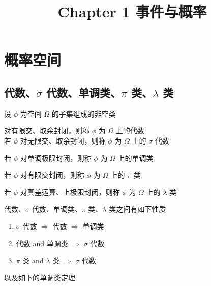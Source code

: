 \documentclass[12pt,a4paper]{amsart}
\title{Chapter 1 事件与概率}
\begin{document}
\maketitle\cite{杨振明2007}

\section{概率空间}

\subsection{代数、$\sigma$ 代数、单调类、$\pi$ 类、$\lambda$ 类}

设 $\phi$ 为空间 $\Omega$ 的子集组成的非空类

\begin{definition}
    对有限交、取余封闭，则称 $\phi$ 为 $\Omega$ 上的代数 \\
    若 $\phi$ 对无限交、取余封闭，则称 $\phi$ 为 $\Omega$ 上的 $\sigma$ 代数
\end{definition}

\begin{definition}[单调类]
    若 $\phi$ 对单调极限封闭，则称 $\phi$ 为 $\Omega$ 上的单调类
\end{definition}

\begin{definition}[$\pi$ 类]
    若 $\phi$ 对有限交封闭，则称 $\phi$ 为 $\Omega$ 上的 $\pi$ 类
\end{definition}

\begin{definition}[$\lambda$ 类]
    若 $\phi$ 对真差运算、上极限封闭，则称 $\phi$ 为 $\Omega$ 上的 $\lambda$ 类
\end{definition}

代数、$\sigma$ 代数、单调类、$\pi$ 类、$\lambda$ 类之间有如下性质

\begin{proposition}
    \begin{enumerate}
        \item $\sigma$ 代数 $\Rightarrow$ 代数 $\Rightarrow$ 单调类
        \item 代数 and 单调类 $\Rightarrow$ $\sigma$ 代数
        \item $\pi$ 类 and $\lambda$ 类 $\Rightarrow$ $\sigma$ 代数
    \end{enumerate}
\end{proposition}

以及如下的单调类定理
\end{document}
